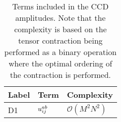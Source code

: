         \begin{table}
            \centering
            \caption{Terms included in the CCD amplitudes.
            Note that the complexity is based on the tensor contraction being
            performed as a binary operation where the optimal ordering of the
            contraction is performed.}
            \renewcommand{\arraystretch}{1.3}
            \begin{tabular}{@{}lll@{}}
                \toprule
                Label & Term & Complexity \\
                \midrule
                D1 & $u^{ab}_{ij}$ & $\mathcal{O}(M^2 N^2)$ \\
                \bottomrule
            \end{tabular}
            \label{tab:ccd-amplitude-terms}
        \end{table}


